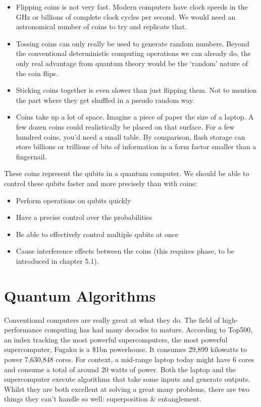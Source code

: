 \begin{itemize}
    \item Flipping coins is not very fast. Modern computers have clock speeds in the GHz or billions of complete clock cycles per second. We would need an astronomical number of coins to try and replicate that. 
    
    \item Tossing coins can only really be used to generate random numbers. Beyond the conventional deterministic computing operations we can already do, the only real advantage from quantum theory would be the `random' nature of the coin flips. 
    
    \item Sticking coins together is even slower than just flipping them. Not to mention the part where they get shuffled in a pseudo random way. 
    
    \item Coins take up a lot of space. Imagine a piece of paper the size of a laptop. A few dozen coins could realistically be placed on that surface. For a few hundred coins, you'd need a small table. By comparison, flash storage can store billions or trillions of bits of information in a form factor smaller than a fingernail. 
 
\end{itemize}

These coins represent the qubits in a quantum computer. We should be able to control these qubits faster and more precisely than with coins:
\begin{itemize}
\item Perform operations on qubits quickly 
\item Have a precise control over the probabilities 
\item Be able to effectively control multiple qubits at once
\item Cause interference effects between the coins (this requires phase, to be introduced in chapter 5.1).
\end{itemize}

\section{Quantum Algorithms} 

 Conventional computers are really great at what they do. The field of high-performance computing has had many decades to mature. According to Top500, an index tracking the most powerful supercomputers, the most powerful supercomputer, Fugaku is a \$1bn powerhouse. It consumes 29,899 kilowatts to power 7,630,848 cores. For context, a mid-range laptop today might have 6 cores and consume a total of around 20 watts of power. Both the laptop and the supercomputer execute algorithms that take some inputs and generate outputs. Whilst they are both excellent at solving a great many problems, there are two things they can't handle so well: superposition \& entanglement. 

